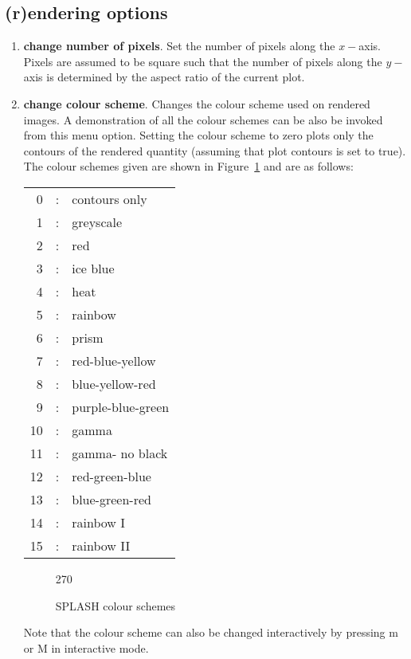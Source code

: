 \documentclass[a4paper,11pt]{article}
\begin{document}
\subsection{(r)endering options}
\begin{enumerate}
\item \textbf{change number of pixels}. Set the number of pixels along the
$x-$axis. Pixels are assumed to be square such that the number of pixels along
the $y-$axis is determined by the aspect ratio of the current plot.
\item \textbf{change colour scheme}. Changes the colour scheme used on rendered
images. A demonstration of all the colour schemes can be also be invoked from
this menu option. Setting the colour scheme to zero plots only the contours of
the rendered quantity (assuming that plot contours is set to true). The colour
schemes given are shown in Figure~\ref{fig:colourschemes} and are as follows:

\begin{tabular}{rcp{}}
  0 & : & contours only \\
  1 & : & greyscale \\
  2 & : & red \\
  3 & : & ice blue \\
  4 & : & heat \\
  5 & : & rainbow \\
  6 & : & prism \\
  7 & : & red-blue-yellow \\
  8 & : & blue-yellow-red \\
  9 & : & purple-blue-green \\
  10 & : & gamma \\
  11 & : & gamma- no black \\
  12 & : & red-green-blue \\
  13 & : & blue-green-red \\
  14 & : & rainbow I \\
  15 & : & rainbow II \\
\end{tabular}

\begin{figure}
\begin{center}
\begin{turn}{270}\end{turn}
\caption{SPLASH colour schemes}
\label{fig:colourschemes}
\end{center}
\end{figure}
Note that the colour scheme can also be changed interactively by pressing m or M
in interactive mode.


\end{enumerate}
\end{document}

